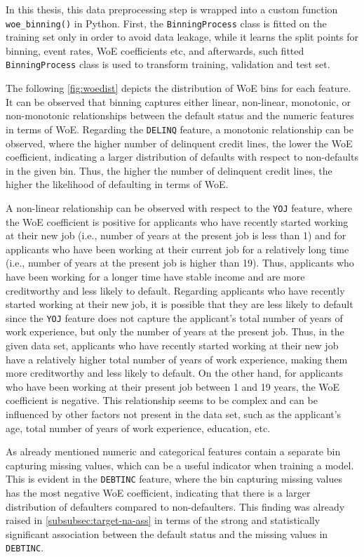 In this thesis, this data preprocessing step is wrapped into a custom function \lstinline{woe_binning()} in Python.
First, the  \lstinline{BinningProcess} class is fitted on the training set only in order to avoid data leakage, while it learns the split points for binning, event rates, WoE coefficients etc, and afterwards, such fitted  \lstinline{BinningProcess} class is used to transform training, validation and test set.


The following \autoref{fig:woedist} depicts the distribution of WoE bins for each feature. It can be observed that binning captures either linear, non-linear, monotonic, or non-monotonic relationships between the default status and the numeric features in terms of WoE.
Regarding the \texttt{DELINQ} feature, a monotonic relationship can be observed, where the higher number of delinquent credit lines, the lower the WoE coefficient, indicating a larger distribution of defaults with respect to non-defaults in the given bin.
Thus, the higher the number of delinquent credit lines, the higher the likelihood of defaulting in terms of WoE.

A non-linear relationship can be observed with respect to the \texttt{YOJ} feature, where the WoE coefficient is positive for applicants who have recently started working at their new job (i.e., number of years at the present job is less than 1) and for applicants who have been working at their current job for a relatively long time (i.e., number of years at the present job is higher than 19).
Thus, applicants who have been working for a longer time have stable income and are more creditworthy and less likely to default.
Regarding applicants who have recently started working at their new job, it is possible that they are less likely to default since the \texttt{YOJ} feature does not capture the applicant's total number of years of work experience, but only the number of years at the present job.
Thus, in the given data set, applicants who have recently started working at their new job have a relatively higher total number of years of work experience, making them more creditworthy and less likely to default. On the other hand, for applicants who have been working at their present job between 1 and 19 years, the WoE coefficient is negative.
This relationship seems to be complex and can be influenced by other factors not present in the data set, such as the applicant's age, total number of years of work experience, education, etc.

As already mentioned numeric and categorical features contain a separate bin capturing missing values, which can be a useful indicator when training a model. This is evident in the \texttt{DEBTINC} feature, where the bin capturing missing values has the most negative WoE coefficient, indicating that there is a larger distribution of defaulters compared to non-defaulters.
This finding was already raised in \autoref{subsubsec:target-na-ass} in terms of the strong and statistically significant association between the default status and the missing values in \texttt{DEBTINC}.

